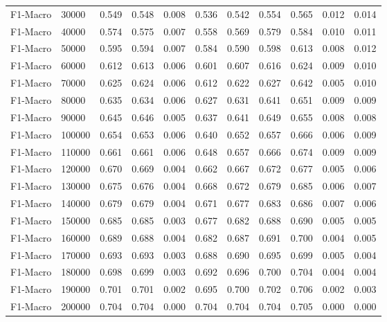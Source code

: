 \begin{table}[htbp]
\begin{table}
\begin{tabular}{ll|rrrrrrrrr}
F1-Macro & 30000 & 0.549 & 0.548 & 0.008 & 0.536 & 0.542 & 0.554 & 0.565 & 0.012 & 0.014 \\
F1-Macro & 40000 & 0.574 & 0.575 & 0.007 & 0.558 & 0.569 & 0.579 & 0.584 & 0.010 & 0.011 \\
F1-Macro & 50000 & 0.595 & 0.594 & 0.007 & 0.584 & 0.590 & 0.598 & 0.613 & 0.008 & 0.012 \\
F1-Macro & 60000 & 0.612 & 0.613 & 0.006 & 0.601 & 0.607 & 0.616 & 0.624 & 0.009 & 0.010 \\
F1-Macro & 70000 & 0.625 & 0.624 & 0.006 & 0.612 & 0.622 & 0.627 & 0.642 & 0.005 & 0.010 \\
F1-Macro & 80000 & 0.635 & 0.634 & 0.006 & 0.627 & 0.631 & 0.641 & 0.651 & 0.009 & 0.009 \\
F1-Macro & 90000 & 0.645 & 0.646 & 0.005 & 0.637 & 0.641 & 0.649 & 0.655 & 0.008 & 0.008 \\
F1-Macro & 100000 & 0.654 & 0.653 & 0.006 & 0.640 & 0.652 & 0.657 & 0.666 & 0.006 & 0.009 \\
F1-Macro & 110000 & 0.661 & 0.661 & 0.006 & 0.648 & 0.657 & 0.666 & 0.674 & 0.009 & 0.009 \\
F1-Macro & 120000 & 0.670 & 0.669 & 0.004 & 0.662 & 0.667 & 0.672 & 0.677 & 0.005 & 0.006 \\
F1-Macro & 130000 & 0.675 & 0.676 & 0.004 & 0.668 & 0.672 & 0.679 & 0.685 & 0.006 & 0.007 \\
F1-Macro & 140000 & 0.679 & 0.679 & 0.004 & 0.671 & 0.677 & 0.683 & 0.686 & 0.007 & 0.006 \\
F1-Macro & 150000 & 0.685 & 0.685 & 0.003 & 0.677 & 0.682 & 0.688 & 0.690 & 0.005 & 0.005 \\
F1-Macro & 160000 & 0.689 & 0.688 & 0.004 & 0.682 & 0.687 & 0.691 & 0.700 & 0.004 & 0.005 \\
F1-Macro & 170000 & 0.693 & 0.693 & 0.003 & 0.688 & 0.690 & 0.695 & 0.699 & 0.005 & 0.004 \\
F1-Macro & 180000 & 0.698 & 0.699 & 0.003 & 0.692 & 0.696 & 0.700 & 0.704 & 0.004 & 0.004 \\
F1-Macro & 190000 & 0.701 & 0.701 & 0.002 & 0.695 & 0.700 & 0.702 & 0.706 & 0.002 & 0.003 \\
F1-Macro & 200000 & 0.704 & 0.704 & 0.000 & 0.704 & 0.704 & 0.704 & 0.705 & 0.000 & 0.000 \\
\bottomrule
\end{tabular}
\end{table}
\end{table}
